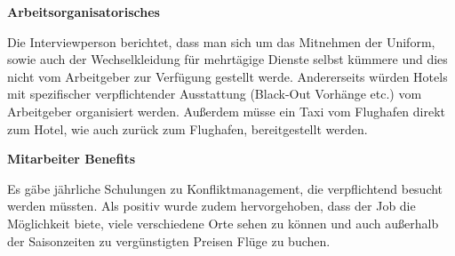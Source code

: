 \documentclass[12pt, a4paper]{article}
\begin{document}
\textbf{Arbeitsorganisatorisches}

Die Interviewperson berichtet, dass man sich um das Mitnehmen der Uniform, sowie auch der Wechselkleidung für mehrtägige
Dienste selbst kümmere und dies nicht vom Arbeitgeber zur Verfügung gestellt werde.
Andererseits würden Hotels mit spezifischer verpflichtender Ausstattung (Black-Out Vorhänge etc.) vom Arbeitgeber organisiert werden.
Außerdem müsse ein Taxi vom Flughafen direkt zum Hotel, wie auch zurück zum Flughafen, bereitgestellt werden.

\textbf{Mitarbeiter Benefits}

Es gäbe jährliche Schulungen zu Konfliktmanagement, die verpflichtend besucht werden müssten.
Als positiv wurde zudem hervorgehoben, dass der Job die Möglichkeit biete, viele verschiedene Orte sehen zu können und
auch außerhalb der Saisonzeiten zu vergünstigten Preisen Flüge zu buchen.

\newpage
\printbibliography
\end{document}
